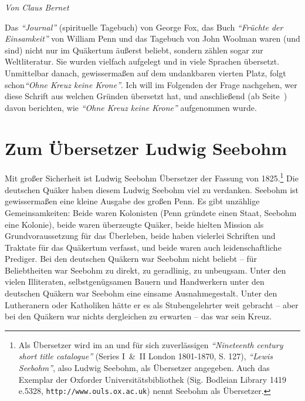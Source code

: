 
\begin{flushright}
\begin{footnotesize}
\textit{Von Claus Bernet}
\end{footnotesize}
\end{flushright}
\smallskip

Das \textit{"`Journal"'} (spirituelle Tagebuch) von George Fox, das Buch \textit{"`Früchte der Einsamkeit"'} von William
Penn und das Tagebuch von John
Woolman waren (und sind) nicht nur im Quäkertum
äußerst beliebt, sondern zählen sogar zur Weltliteratur.
Sie wurden vielfach aufgelegt und in viele Sprachen übersetzt. Unmittelbar
danach, gewissermaßen auf dem undankbaren vierten Platz, folgt schon\textit{"`Ohne
Kreuz keine Krone"'}. Ich will im Folgenden der Frage nachgehen, wer diese
Schrift
aus welchen Gründen übersetzt hat, und anschließend (ab
Seite~\pageref{ref:rezeptionsgeschichte}) davon berichten, wie \textit{"`Ohne Kreuz
keine Krone"'} aufgenommen wurde.

\section{Zum Übersetzer Ludwig Seebohm} \label{ref:l_seebohm}


Mit großer Sicherheit ist Ludwig Seebohm
Übersetzer der Fassung von 1825.\footnote{Als Übersetzer wird im an und für sich
zuverlässigen \textit{"`Nineteenth century
short title catalogue"'} (Series I~\&~II London 1801-1870, S. 127), \textit{"`Lewis
Seebohm"'}, also Ludwig Seebohm, als Übersetzer angegeben. Auch das Exemplar der
Oxforder Universitätsbibliothek (Sig. Bodleian Library 1419 e.5328,
\texttt{http://www.ouls.ox.ac.uk}) nennt Seebohm als Übersetzer.}
Die deutschen Quäker haben diesem Ludwig Seebohm viel zu
verdanken. Seebohm ist gewissermaßen eine kleine Ausgabe des großen Penn. Es
gibt unzählige Gemeinsamkeiten: Beide waren Kolonisten (Penn gründete einen
Staat, Seebohm eine Kolonie), beide waren überzeugte Quäker, beide hielten
Mission als Grundvoraussetzung für das Überleben, beide haben
vielerlei Schriften und Traktate für das Quäkertum verfasst, und beide waren
auch leidenschaftliche Prediger.
Bei den deutschen Quäkern war Seebohm nicht beliebt -- für Beliebtheiten war
Seebohm zu direkt, zu geradlinig, zu unbeugsam. Unter den vielen Illiteraten,
selbstgenügsamen Bauern und
Handwerkern unter den deutschen Quäkern war Seebohm
eine einsame Ausnahmegestalt. Unter den Lutheranern
oder Katholiken hätte er es als Stubengelehrter weit
gebracht -- aber bei den Quäkern war nichts dergleichen zu erwarten -- das war
sein Kreuz.

